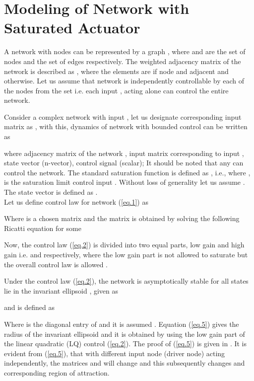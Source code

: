 \documentclass[conference]{IEEEtran}
\begin{document}
\newtheorem{thm}{\textbf{Theorem}}
\newtheorem{rem}{\textbf{Remark}}
\newtheorem{lm}{\textbf{Lemma}}
\newtheorem{assum}{\textbf{Assumption}}
\newtheorem{condi}{\textbf{Condition}}
\newtheorem{defi}{\textbf{Definition}}
\newtheorem{propos}{\textbf{Proposition}}
\newtheorem{corol}{\textbf{Corollary}}
\newtheorem{example}{\textbf{Example}}
\section{Modeling of Network with Saturated Actuator}
A network with  nodes can be represented by a graph , where  and  are the set of nodes and the set of edges respectively. The weighted adjacency matrix of the network  is described as , where the elements are  if node  and  adjacent and  otherwise. Let us assume that network  is independently controllable by each of the nodes from the set  i.e. each input , acting alone can control the entire network.
\par Consider a complex network with input , let us designate corresponding input matrix as , with this, dynamics of network with bounded control can be written as

where  adjacency matrix of the network ,  input matrix corresponding to  input ,  state vector (n-vector),  control signal (scalar); It should be noted that any  can control the network. The standard saturation function  is defined as , i.e.,  where ,  is the saturation limit control input . Without loss of generality let us assume . The state vector is defined as . \\
Let us define control law for network (\ref{eq.1}) as

Where  is a chosen matrix and the matrix  is obtained by solving the following Ricatti equation for some 

\par Now, the control law (\ref{eq.2}) is divided into two equal parts, low gain and high gain i.e.  and  respectively, where the low gain part is not allowed to saturate but the overall control law  is allowed \cite{turner2001guaranteed}.

\par Under the control law (\ref{eq.2}), the network is asymptotically stable for all states lie in the invariant ellipsoid , \cite{gutman1982new} given as
 
 	and  is defined as
 
  Where  is the  diagonal entry of  and it is assumed . Equation (\ref{eq.5}) gives the radius of the invariant ellipsoid  and it is obtained by using the low gain part of the linear quadratic (LQ) control (\ref{eq.2}). The proof of (\ref{eq.5}) is given in \cite{turner2001guaranteed,gutman1982new,Henrion1999}. It is evident from (\ref{eq.5}), that with different input node (driver node) acting independently, the matrices  and  will change and this subsequently changes  and corresponding region of attraction.
\end{document}
